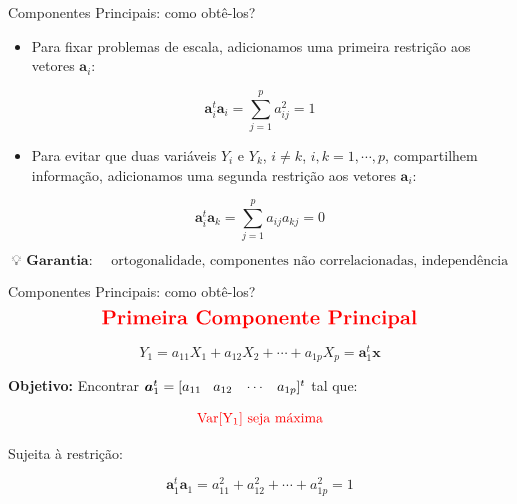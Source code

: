 \documentclass[
  ignorenonframetext,
  aspectratio=169,
]{beamer}
\providecommand{\tightlist}{%
  \setlength{\itemsep}{0pt}\setlength{\parskip}{0pt}}
\begin{document}
\begin{frame}{Componentes Principais: como obtê-los?}
\label{componentes-principais-como-obtuxea-los-1}
\begin{itemize}
\tightlist
\item
  Para fixar problemas de escala, adicionamos uma primeira restrição aos
  vetores \(\mathbf{a}_i\):
\end{itemize}

\[\mathbf{a}_i^t \mathbf{a}_i = \displaystyle{ \sum_{j=1}^p a_{ij}^2} = 1\]

\pause

\begin{itemize}
\tightlist
\item
  Para evitar que duas variáveis \(Y_i\) e \(Y_k\), \(i \neq k\),
  \(i,k = 1, \cdots, p\), compartilhem informação, adicionamos uma
  segunda restrição aos vetores \(\mathbf{a}_i\):
\end{itemize}

\[\mathbf{a}_i^t \mathbf{a}_k = \displaystyle{ \sum_{j=1}^p a_{ij}a_{kj}}  = 0\]

\pause

\[
\textbf{💡 Garantia: } 
\quad 
\text{ortogonalidade, componentes não correlacionadas, independência}
\]
\end{frame}

\begin{frame}{Componentes Principais: como obtê-los?}
\label{componentes-principais-como-obtuxea-los-2}
\[
{\color{red}{\Large \textbf{Primeira Componente Principal}}}
\]

\[Y_1 = a_{11}X_1 + a_{12}X_2 + \cdots + a_{1p}X_p = \boldsymbol{a}_1^t \mathbf{x}\]

\pause

\textbf{Objetivo:} Encontrar
\(\boldsymbol{a}_1^t = [a_{11} \hspace{0.3cm} a_{12} \hspace{0.3cm} \cdots \hspace{0.3cm} a_{1p}]^t\)
tal que:

\[
{\color{red}{ \rm{Var}[Y_1]\ \text{seja máxima}}}
\]

\pause

Sujeita à restrição:

\[\boldsymbol{a}_1^t \boldsymbol{a}_1 = a_{11}^2 + a_{12}^2 + \cdots + a_{1p}^2 = 1\]
\end{frame}
\end{document}
